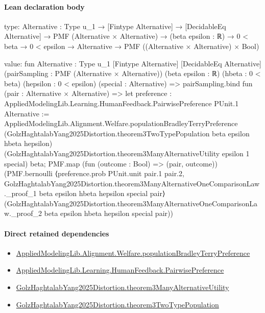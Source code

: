 \documentclass[10pt]{article}
\begin{document}
\paragraph{Lean declaration body}
\begin{ReviewVerbatim}
type:
{Alternative : Type u_1} →
  [Fintype Alternative] →
    [DecidableEq Alternative] →
      PMF (Alternative × Alternative) →
        (beta epsilon : ℝ) → 0 < beta → 0 < epsilon → Alternative → PMF ((Alternative × Alternative) × Bool)

value:
fun {Alternative : Type u_1} [Fintype Alternative] [DecidableEq Alternative]
    (pairSampling : PMF (Alternative × Alternative)) (beta epsilon : ℝ) (hbeta : 0 < beta) (hepsilon : 0 < epsilon)
    (special : Alternative) =>
  pairSampling.bind fun (pair : Alternative × Alternative) =>
    let preference : AppliedModelingLib.Learning.HumanFeedback.PairwisePreference PUnit.{1} Alternative :=
      AppliedModelingLib.Alignment.Welfare.populationBradleyTerryPreference
        (GolzHaghtalabYang2025Distortion.theorem3TwoTypePopulation beta epsilon hbeta hepsilon)
        (GolzHaghtalabYang2025Distortion.theorem3ManyAlternativeUtility epsilon 1 special) beta;
    PMF.map (fun (outcome : Bool) => (pair, outcome))
      (PMF.bernoulli
        ⟨preference.prob PUnit.unit pair.1 pair.2,
          GolzHaghtalabYang2025Distortion.theorem3ManyAlternativeOneComparisonLaw._proof_1 beta epsilon hbeta hepsilon
            special pair⟩
        (GolzHaghtalabYang2025Distortion.theorem3ManyAlternativeOneComparisonLaw._proof_2 beta epsilon hbeta hepsilon
          special pair))
\end{ReviewVerbatim}

\paragraph{Direct retained dependencies}
\begin{itemize}\raggedright
\item \hyperlink{library-prerequisite-cf06d15d7f8b7c31}{Applied\allowbreak{}Modeling\allowbreak{}Lib.\allowbreak{}Alignment.\allowbreak{}Welfare.\allowbreak{}population\allowbreak{}Bradley\allowbreak{}Terry\allowbreak{}Preference}
\item \hyperlink{library-prerequisite-7e2db20cf087d9ba}{Applied\allowbreak{}Modeling\allowbreak{}Lib.\allowbreak{}Learning.\allowbreak{}Human\allowbreak{}Feedback.\allowbreak{}Pairwise\allowbreak{}Preference}
\item \hyperlink{governing-declaration-bfef2d422eb25497}{Golz\allowbreak{}Haghtalab\allowbreak{}Yang2025\allowbreak{}Distortion.\allowbreak{}theorem3\allowbreak{}Many\allowbreak{}Alternative\allowbreak{}Utility}
\item \hyperlink{governing-declaration-5256b014ca2f6f1b}{Golz\allowbreak{}Haghtalab\allowbreak{}Yang2025\allowbreak{}Distortion.\allowbreak{}theorem3\allowbreak{}Two\allowbreak{}Type\allowbreak{}Population}
\end{itemize}
\hypertarget{governing-declaration-8cd7a7c5a45b332d}{}
\end{document}
